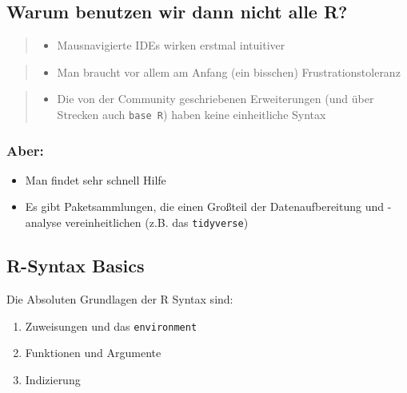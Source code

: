 \documentclass[
]{book}
\providecommand{\tightlist}{%
  \setlength{\itemsep}{0pt}\setlength{\parskip}{0pt}}
\begin{document}
\hypertarget{warum-benutzen-wir-dann-nicht-alle-r}{%
\subsection{Warum benutzen wir dann nicht alle R?}\label{warum-benutzen-wir-dann-nicht-alle-r}}

\begin{quote}
\begin{itemize}
\tightlist
\item
  Mausnavigierte IDEs wirken erstmal intuitiver
\end{itemize}
\end{quote}

\begin{quote}
\begin{itemize}
\tightlist
\item
  Man braucht vor allem am Anfang (ein bisschen) Frustrationstoleranz
\end{itemize}
\end{quote}

\begin{quote}
\begin{itemize}
\tightlist
\item
  Die von der Community geschriebenen Erweiterungen (und über Strecken auch \texttt{base\ R}) haben keine einheitliche Syntax
\end{itemize}
\end{quote}

\hypertarget{aber}{%
\subsubsection{Aber:}\label{aber}}

\begin{itemize}
\item
  Man findet sehr schnell Hilfe
\item
  Es gibt Paketsammlungen, die einen Großteil der Datenaufbereitung und -analyse vereinheitlichen (z.B. das \texttt{tidyverse})
\end{itemize}

\hypertarget{r-syntax-basics}{%
\subsection{R-Syntax Basics}\label{r-syntax-basics}}

Die Absoluten Grundlagen der R Syntax sind:

\begin{enumerate}
\def\labelenumi{\arabic{enumi}.}
\item
  Zuweisungen und das \texttt{environment}
\item
  Funktionen und Argumente
\item
  Indizierung
\end{enumerate}
\end{document}

